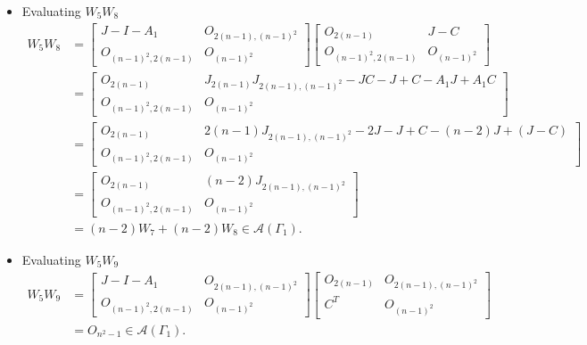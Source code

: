 \begin{itemize}
    \item Evaluating $W_5W_8$
    \begin{align*}
        W_5W_8
        &= \begin{bmatrix}
            J-I-A_1 & O_{2(n-1), (n-1)^2} \\
            O_{(n-1)^2, 2(n-1)} & O_{(n-1)^2}
        \end{bmatrix}\begin{bmatrix}
            O_{2(n-1)} & J-C \\
            O_{(n-1)^2, 2(n-1)} & O_{(n-1)^2}
        \end{bmatrix}\\
        &= \begin{bmatrix}
            O_{2(n-1)} & J_{2(n-1)}J_{2(n-1),(n-1)^2} - JC-J+C - A_1J+A_1C \\
            O_{(n-1)^2, 2(n-1)} & O_{(n-1)^2}
        \end{bmatrix}\\
        &= \begin{bmatrix}
            O_{2(n-1)} & 2(n-1)J_{2(n-1),(n-1)^2} -2J - J + C - (n-2)J + (J-C) \\
            O_{(n-1)^2, 2(n-1)} & O_{(n-1)^2}
        \end{bmatrix}\\
        &= \begin{bmatrix}
            O_{2(n-1)} & (n-2)J_{2(n-1), (n-1)^2} \\
            O_{(n-1)^2, 2(n-1)} & O_{(n-1)^2}
        \end{bmatrix}\\
        &= (n-2)W_7 + (n-2)W_8\in\mathcal{A}(\Gamma_1).
    \end{align*}

    \item Evaluating $W_5W_9$
    \begin{align*}
        W_5W_9
        &= \begin{bmatrix}
            J-I-A_1 & O_{2(n-1), (n-1)^2} \\
            O_{(n-1)^2, 2(n-1)} & O_{(n-1)^2}
        \end{bmatrix}\begin{bmatrix}
            O_{2(n-1)} & O_{2(n-1), (n-1)^2} \\
            C^T & O_{(n-1)^2}
        \end{bmatrix}\\
        &= O_{n^2-1}\in\mathcal{A}(\Gamma_1).
    \end{align*}
    

\end{itemize}
